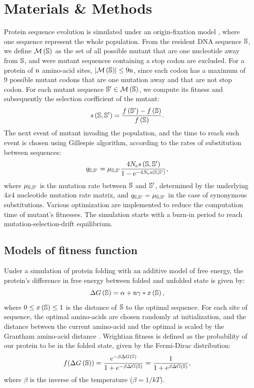 \documentclass{article}
\begin{document}
\section*{Materials \& Methods}
Protein sequence evolution is simulated under an origin-fixation model \cite{McCandlish2014}, where one sequence represent the whole population.
From the resident DNA sequence $\mathbb{S}$, we define $\mathcal{M}\left(\mathbb{S}\right)$ as the set of all possible mutant that are one nucleotide away from $\mathbb{S}$, and were mutant sequences containing a stop codon are excluded.
For a protein of $\text{n}$ amino-acid sites, $\left| \mathcal{M}\left(\mathbb{S}\right) \right| \leq 9 \text{n}$, since each codon has a maximum of $9$ possible mutant codons that are one mutation away and that are not stop codon.
For each mutant sequence $\mathbb{S}' \in \mathcal{M}\left(\mathbb{S}\right)$, we compute its fitness and subsequently the selection coefficient of the mutant:
\begin{equation}
s \left( \mathbb{S},\mathbb{S}'\right) = \dfrac{ f \left(\mathbb{S}' \right) - f \left(\mathbb{S}\right) }{f\left( \mathbb{S} \right)}.
\end{equation}
The next event of mutant invading the population, and the time to reach such event is chosen using Gillespie algorithm, according to the rates of substitution between sequences:
\begin{equation}
q_{\mathbb{S}, \mathbb{S}'} = \mu_{\mathbb{S}, \mathbb{S}'} \dfrac{4 N_{\mathrm{e}} s \left( \mathbb{S},\mathbb{S}'\right)}{1 - \mathrm{e}^{-4 N_{\mathrm{e}} s \left( \mathbb{S},\mathbb{S}'\right)}}, 
\end{equation}
where $\mu_{\mathbb{S}, \mathbb{S}'}$ is the mutation rate between $\mathbb{S}$ and $\mathbb{S}'$, determined by the underlying $4x4$ nucleotide mutation rate matrix, and ${q_{\mathbb{S}, \mathbb{S}'}} = \mu_{\mathbb{S}, \mathbb{S}'}$ in the case of synonymous substitutions.
Various optimization are implemented to reduce the computation time of mutant's fitnesses.
The simulation starts with a burn-in period to reach mutation-selection-drift equilibrium.
\subsection*{Models of fitness function}
\label{MatMet:folding}
Under a simulation of protein folding with an additive model of free energy, the protein's difference in free energy between folded and unfolded state is given by:
\begin{equation*}
\Delta G\left(\mathbb{S}\right) = \alpha + \text{n} \gamma * x\left(\mathbb{S}\right), 
\end{equation*}
where $0 \leq x\left(\mathbb{S}\right) \leq 1$ is the distance of $\mathbb{S}$ to the optimal sequence.
For each site of sequence, the optimal amino-acids are chosen randomly at initialization, and the distance between the current amino-acid and the optimal is scaled by the Grantham amino-acid distance \cite{Grantham1974}.
Wrightian fitness is defined as the probability of our protein to be in the folded state, given by the Fermi-Dirac distribution: 
\begin{equation}
f(\Delta G\left(\mathbb{S}\right)) = \dfrac{e^{-\beta \Delta G\left(\mathbb{S}\right) }}{1 + e^{-\beta \Delta G\left(\mathbb{S}\right) }} = \dfrac{1}{1 + e^{\beta \Delta G\left(\mathbb{S}\right) }}, 
\end{equation}
where $\beta$ is the inverse of the temperature ($\beta=1/kT$).\\
\end{document}
